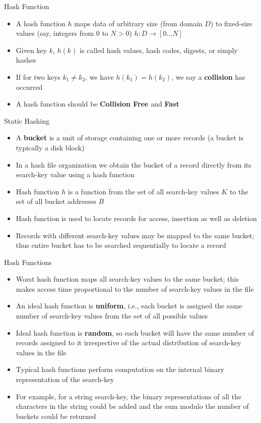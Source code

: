 \documentclass[aspectratio=169, xcolor=dvipsnames]{beamer}
\begin{document}
\begin{frame}{Hash Function}
    \begin{itemize}[<+->]
        \item A hash function $h$ maps data of arbitrary size (from domain $D$) to fixed-size values (say, integers from 0 to $N > 0$) $h: D \rightarrow [0 \dots N]$
        \item Given key $k$, $h(k)$ is called hash values, hash codes, digests, or simply hashes
        \item If for two keys $k_1 \neq k_2$, we have $h(k_1) = h(k_2)$, we say a \textbf{collision} has occurred
        \item A hash function should be \textbf{Collision Free} and \textbf{Fast}
    \end{itemize}
\end{frame}

\begin{frame}{Static Hashing}
    \begin{itemize}[<+->]
        \item A \textbf{bucket} is a unit of storage containing one or more records (a bucket is typically a disk block)
        \item In a hash file organization we obtain the bucket of a record directly from its search-key value using a hash function
        \item Hash function $h$ is a function from the set of all search-key values $K$ to the set of all bucket addresses $B$
        \item Hash function is used to locate records for access, insertion as well as deletion
        \item Records with different search-key values may be mapped to the same bucket; thus entire bucket has to be searched sequentially to locate a record
    \end{itemize}
\end{frame}

\begin{frame}{Hash Functions}
    \begin{itemize}[<+->]
        \item Worst hash function maps all search-key values to the same bucket; this makes access time proportional to the number of search-key values in the file
        \item An ideal hash function is \textbf{uniform}, i.e., each bucket is assigned the same number of search-key values from the set of all possible values
        \item Ideal hash function is \textbf{random}, so each bucket will have the same number of records assigned to it irrespective of the actual distribution of search-key values in the file
        \item Typical hash functions perform computation on the internal binary representation of the search-key
        \item For example, for a string search-key, the binary representations of all the characters in the string could be added and the sum modulo the number of buckets could be returned
    \end{itemize}
\end{frame}
\end{document}
